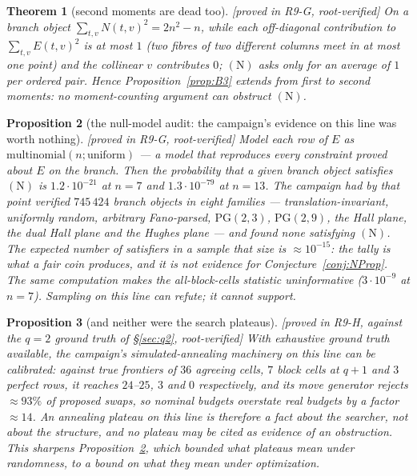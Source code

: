 \documentclass[11pt]{article}
\theoremstyle{plain}
\newtheorem{theorem}{Theorem}[section]
\newtheorem{proposition}[theorem]{Proposition}
\theoremstyle{definition}
\theoremstyle{remark}
\numberwithin{equation}{section}
\newcommand{\statusbox}[1]{{\small\sloppy\textsf{[#1]}}}
\newcommand{\PROVED}[1]{\statusbox{proved in #1, root-verified}}
\newcommand{\COMP}[1]{\statusbox{computational: #1}}
\begin{document}
\begin{theorem}[second moments are dead too]\label{thm:moments}
\PROVED{R9-G}
On a branch object $\sum_{t,v}N(t,v)^2 = 2n^2-n$, while each off-diagonal
contribution to $\sum_{t,v}E(t,v)^2$ is at most $1$ (two fibres of two different
columns meet in at most one point) and the collinear $v$ contributes $0$; $(\mathrm{N})$
asks only for an average of $1$ per ordered pair. Hence
Proposition~\ref{prop:B3} extends from first to second moments: \emph{no
moment-counting argument can obstruct $(\mathrm{N})$}.
\end{theorem}

\begin{proposition}[the null-model audit: the campaign's evidence on this line
was worth nothing]\label{prop:null}
\PROVED{R9-G}\;\COMP{R9G\_global.py}
Model each row of $E$ as $\mathrm{multinomial}(n;\text{uniform})$ --- a model that
reproduces every constraint proved about $E$ on the branch. Then the probability
that a given branch object satisfies $(\mathrm{N})$ is $1.2\cdot10^{-21}$ at
$n = 7$ and $1.3\cdot10^{-79}$ at $n = 13$. The campaign had by that point
verified $745\,424$ branch objects in eight families ---
translation-invariant, uniformly random, arbitrary Fano-parsed,
$\mathrm{PG}(2,3)$, $\mathrm{PG}(2,9)$, the Hall plane, the dual Hall plane and
the Hughes plane --- and found none satisfying $(\mathrm{N})$. The expected number
of satisfiers in a sample that size is $\approx10^{-15}$: \emph{the tally is what
a fair coin produces, and it is not evidence for
Conjecture~\ref{conj:NProp}}. The same computation makes the all-block-cells
statistic uninformative ($3\cdot10^{-9}$ at $n = 7$). Sampling on this line can
refute; it cannot support.
\end{proposition}

\begin{proposition}[and neither were the search plateaus]\label{prop:searcherblind}
\PROVED{R9-H, against the $q = 2$ ground truth of \S\ref{sec:q2}}
With exhaustive ground truth available, the campaign's simulated-annealing
machinery on this line can be calibrated: against true frontiers of $36$ agreeing
cells, $7$ block cells at $q+1$ and $3$ perfect rows, it reaches $24$--$25$, $3$
and $0$ respectively, and its move generator rejects $\approx93\%$ of proposed
swaps, so nominal budgets overstate real budgets by a factor $\approx14$. An
annealing plateau on this line is therefore a fact about the searcher, not about
the structure, and no plateau may be cited as evidence of an obstruction. This
sharpens Proposition~\ref{prop:null}, which bounded what plateaus mean under
randomness, to a bound on what they mean under optimization.
\end{proposition}
\end{document}
